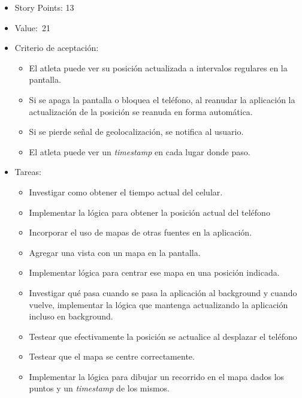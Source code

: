\begin{enumerate}
  \begin{itemize}
  \item
    Story Points: 13
  \item
    Value:~21
  \item
    Criterio de aceptación:

    \begin{itemize}
    \item
      El atleta puede ver su posición actualizada a intervalos regulares
      en la pantalla.
    \item
      Si se apaga la pantalla o bloquea el teléfono, al reanudar la
      aplicación la actualización de la posición se reanuda en forma
      automática.
    \item
      Si se pierde señal de geolocalización, se notifica al usuario.
    \item
      El atleta puede ver un \emph{timestamp} en cada lugar donde paso.
    \end{itemize}
  \item
    Tareas:

    \begin{itemize}
    \item
      Investigar como obtener el tiempo actual del celular.
    \item
      Implementar la lógica para obtener la posición actual del teléfono
    \item
      Incorporar el uso de mapas de otras fuentes en la aplicación.
    \item
      Agregar una vista con un mapa en la pantalla.
    \item
      Implementar lógica para centrar ese mapa en una posición indicada.
    \item
      Investigar qué pasa cuando se pasa la aplicación al background y
      cuando vuelve, implementar la lógica que mantenga actualizando la
      aplicación incluso en background.
    \item
      Testear que efectivamente la posición se actualice al desplazar el
      teléfono
    \item
      Testear que el mapa se centre correctamente.
    \item
      Implementar la lógica para dibujar un recorrido en el mapa dados
      los puntos y un \emph{timestamp} de los mismos.
    \end{itemize}
  \end{itemize}
\end{enumerate}
